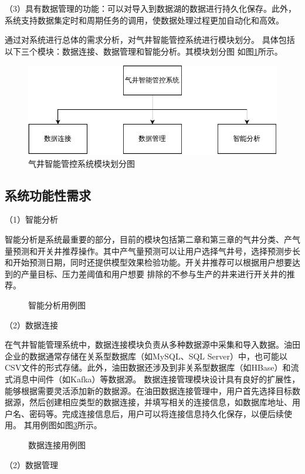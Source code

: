（3）具有数据管理的功能：可以对导入到数据湖的数据进行持久化保存。此外，系统支持数据集定时和周期任务的调用，使数据处理过程更加自动化和高效。

通过对系统进行总体的需求分析，对气井智能管控系统进行模块划分。
具体包括以下三个模块：数据连接、数据管理和智能分析。其模块划分图
如图\ref{fig:allmodules}所示。
\begin{figure}[H]
    \centering
    \label{fig:allmodules}
    \caption{气井智能管控系统模块划分图}
    \includegraphics[width=.8\linewidth]{figure/systemincludemodles.pdf}
\end{figure}
\subsection{系统功能性需求}
（1）智能分析

智能分析是系统最重要的部分，目前的模块包括第二章和第三章的气井分类、产气量预测和开关井推荐操作。其中产气量预测可以让用户选择气井号，选择预测步长和开始预测日期，同时还提供模型效果检验功能。开关井推荐可以根据用户想要达到的产量目标、压力差阈值和用户想要
排除的不参与生产的井来进行开关井的推荐。
\begin{figure}[H]
    \centering
    \caption{智能分析用例图}
    
    \label{fig:analyusecase}
\end{figure}

（2）数据连接

在气井智能管理系统中，数据连接模块负责从多种数据源中采集和导入数据。油田企业的数据通常存储在关系型数据库（如MySQL、SQL Server）中，也可能以CSV文件的形式存储。此外，油田数据还涉及到非关系型数据库（如HBase）和流式消息中间件（如Kafka）等数据源。
数据连接管理模块设计具有良好的扩展性，能够根据需要灵活添加新的数据源。在油田数据连接管理中，用户首先选择目标数据源，然后创建相应类型的数据连接，并填写相关的连接信息，如数据库地址、用户名、密码等。完成连接信息后，用户可以将连接信息持久化保存，以便后续使用。
其用例图如图\ref{fig:dataconnectionusecase}所示。
\begin{figure}[H]
    \centering
    \caption{数据连接用例图}
    
    \label{fig:dataconnectionusecase}
\end{figure}
（2）数据管理 

